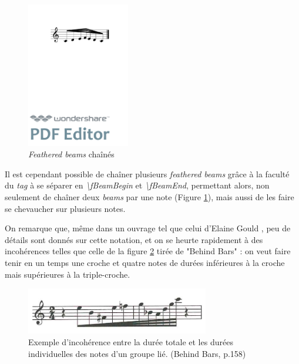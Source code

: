\documentclass{article}
\newenvironment{gmncode}	{\vspace{-2mm}\small\verbatim}{\endverbatim\vspace{-2mm}}
\begin{document}
\begin{figure}[h]
\centering
\begin{gmncode}
[ 
  \fBeamBegin:1 
  c/8 d e/16 
  \fBeamBegin:2 f/32 \fBeamEnd:1 
  e/16 d/8 c
  \fBeamEnd:2 
]
\end{gmncode}
\includegraphics[width=45mm]{img/fBeamChaine.pdf}
\caption{\emph{Feathered beams} chaînés}
\label{fig:fbeamchain}
\end{figure}

Il est cependant possible de chaîner plusieurs \emph{feathered beams} grâce à la faculté du \emph{tag} à se séparer en \emph{\textbackslash{}fBeamBegin} et \emph{\textbackslash{}fBeamEnd}, permettant alors, non seulement de chaîner deux \emph{beams} par une note (Figure \ref{fig:fbeamchain}), mais aussi de les faire se chevaucher sur plusieurs notes.
\bigskip


On remarque que, même dans un ouvrage tel que celui d'Elaine Gould \cite{gould2011behind}, peu de détails sont donnés sur cette notation, et on se heurte rapidement à des incohérences telles que celle de la figure \ref{fig:incoherence} tirée de "Behind Bars" : on veut faire tenir en un temps une croche et quatre notes de durées inférieures à la croche mais supérieures à la triple-croche. 

\begin{figure}[h]
\centering
\includegraphics[width=8cm]{img/behindbars.jpg}
\caption{Exemple d'incohérence entre la durée totale et les durées individuelles des notes d'un groupe lié. (Behind Bars, p.158) }
\label{fig:incoherence}
\end{figure}
\end{document}
